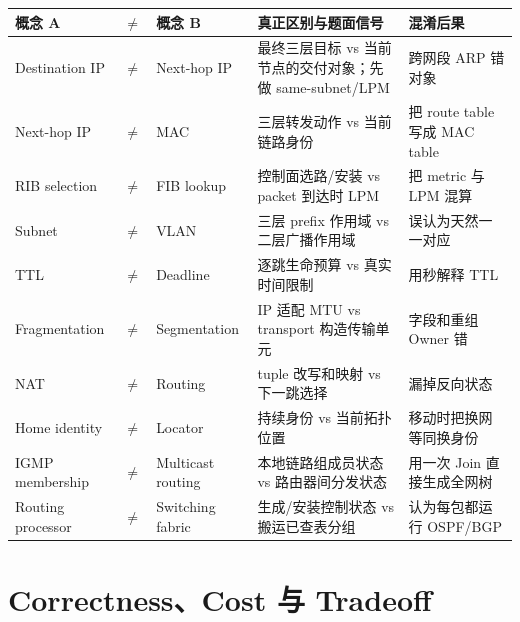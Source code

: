 \documentclass[11pt,a4paper]{ctexart}
\begin{document}
\begin{center}
\small
\begin{tabularx}{\linewidth}{L{1.75cm}C{0.35cm}L{1.75cm}Y Y}
\toprule
概念 A & $\neq$ & 概念 B & 真正区别与题面信号 & 混淆后果\\
\midrule
Destination IP & $\neq$ & Next-hop IP & 最终三层目标 vs 当前节点的交付对象；先做 same-subnet/LPM & 跨网段 ARP 错对象\\
Next-hop IP & $\neq$ & MAC & 三层转发动作 vs 当前链路身份 & 把 route table 写成 MAC table\\
RIB selection & $\neq$ & FIB lookup & 控制面选路/安装 vs packet 到达时 LPM & 把 metric 与 LPM 混算\\
Subnet & $\neq$ & VLAN & 三层 prefix 作用域 vs 二层广播作用域 & 误认为天然一一对应\\
TTL & $\neq$ & Deadline & 逐跳生命预算 vs 真实时间限制 & 用秒解释 TTL\\
Fragmentation & $\neq$ & Segmentation & IP 适配 MTU vs transport 构造传输单元 & 字段和重组 Owner 错\\
NAT & $\neq$ & Routing & tuple 改写和映射 vs 下一跳选择 & 漏掉反向状态\\
Home identity & $\neq$ & Locator & 持续身份 vs 当前拓扑位置 & 移动时把换网等同换身份\\
IGMP membership & $\neq$ & Multicast routing & 本地链路组成员状态 vs 路由器间分发状态 & 用一次 Join 直接生成全网树\\
Routing processor & $\neq$ & Switching fabric & 生成/安装控制状态 vs 搬运已查表分组 & 认为每包都运行 OSPF/BGP\\
\bottomrule
\end{tabularx}
\end{center}

\section{Correctness、Cost 与 Tradeoff}
\end{document}
